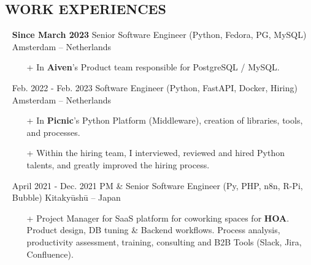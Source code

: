 \documentclass{res}
\begin{document}
  
\ifisanon
        \address{Some parts were removed. These are highlighted by \textit{(Anonymous)}}
\else

        \address{ \faMapMarker*~Pietersbergweg 53-B, 1105 BM, Amsterdam, NL ~~ \faPassport~French \\ \faAt~samuel@giffard.co ~~ \faMobile*~+33 (0) 7-69-69-12-02 ~~ \faMobile*~+31 (0) 6-8348-5505 ~~ \faWhatsapp~+32 (0) 4-84-14-10-33 \\ \\ \textbf{\faPython~Python Trainer, Engineer \& Evangelist} }
\fi

\begin{resume}

\section{\faBriefcase~WORK EXPERIENCES}
        \begin{itemize}
                    \item[] \textbf{Since March 2023} \tabto{5cm} Senior Software Engineer (Python, Fedora, PG, MySQL) \hfill Amsterdam -- Netherlands
                    \begin{itemize}
                        \item[+] In \textbf{Aiven}'s Product team responsible for PostgreSQL / MySQL.
					\end{itemize}
                    \item[] Feb. 2022 - Feb. 2023 \tabto{5cm} Software Engineer (Python, FastAPI, Docker, Hiring) \hfill Amsterdam -- Netherlands
                    \begin{itemize}
                        \item[+] In \textbf{Picnic}'s Python Platform (Middleware), creation of libraries, tools, and processes.
                        \item[+] Within the hiring team, I interviewed, reviewed and hired Python talents, and greatly improved the hiring process.
					\end{itemize}
                    \item[] April 2021 - Dec. 2021 \tabto{5cm} PM \& Senior Software Engineer (Py, PHP, n8n, R-Pi, Bubble) \hfill Kitaky\=ush\=u -- Japan
					\begin{itemize}
                        \item[+] Project Manager for SaaS platform for coworking spaces for \textbf{HOA}. Product design, DB tuning \& Backend workflows. Process analysis, productivity assessment, training, consulting and B2B Tools (Slack, Jira, Confluence).

\end{itemize}
\end{itemize}
\end{resume}
\end{document}
